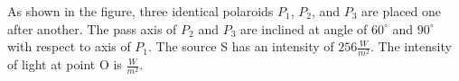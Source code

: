 \item As shown in the figure, three identical polaroids \( P_1 \), \( P_2 \), and \( P_3 \) are placed one after another. The pass axis of \( P_2 \) and \( P_3 \) are inclined at angle of \( 60^\circ \) and \( 90^\circ \) with respect to axis of \( P_1 \). The source S has an intensity of \( 256 \frac{W}{m^2} \). The intensity of light at point O is \underline{\hspace{2.5cm}} \( \frac{W}{m^2} \). 
    
    \begin{center}
    \end{center}
